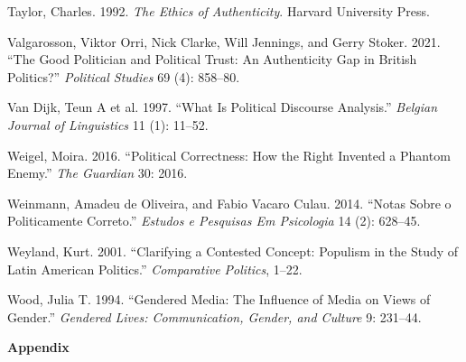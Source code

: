 \documentclass[smallextended]{svjour3}       %
\newlength{\cslhangindent}
\newlength{\cslentryspacingunit} %
\newenvironment{CSLReferences}[2] %
 {%
  \setlength{\parindent}{0pt}
  \ifodd #1
  \let\oldpar\par
  \def\par{\hangindent=\cslhangindent\oldpar}
  \fi
  \setlength{\parskip}{#2\cslentryspacingunit}
 }%
 {}
\begin{document}
\begin{CSLReferences}{1}{0}
\leavevmode{}%
Taylor, Charles. 1992. \emph{The Ethics of Authenticity}. Harvard
University Press.

\leavevmode{}%
Valgarosson, Viktor Orri, Nick Clarke, Will Jennings, and Gerry Stoker.
2021. {``The Good Politician and Political Trust: An Authenticity Gap in
British Politics?''} \emph{Political Studies} 69 (4): 858--80.

\leavevmode{}%
Van Dijk, Teun A et al. 1997. {``What Is Political Discourse
Analysis.''} \emph{Belgian Journal of Linguistics} 11 (1): 11--52.

\leavevmode{}%
Weigel, Moira. 2016. {``Political Correctness: How the Right Invented a
Phantom Enemy.''} \emph{The Guardian} 30: 2016.

\leavevmode{}%
Weinmann, Amadeu de Oliveira, and Fabio Vacaro Culau. 2014. {``Notas
Sobre o Politicamente Correto.''} \emph{Estudos e Pesquisas Em
Psicologia} 14 (2): 628--45.

\leavevmode{}%
Weyland, Kurt. 2001. {``Clarifying a Contested Concept: Populism in the
Study of Latin American Politics.''} \emph{Comparative Politics}, 1--22.

\leavevmode{}%
Wood, Julia T. 1994. {``Gendered Media: The Influence of Media on Views
of Gender.''} \emph{Gendered Lives: Communication, Gender, and Culture}
9: 231--44.

\end{CSLReferences}

\textbf{Appendix}
\end{document}
